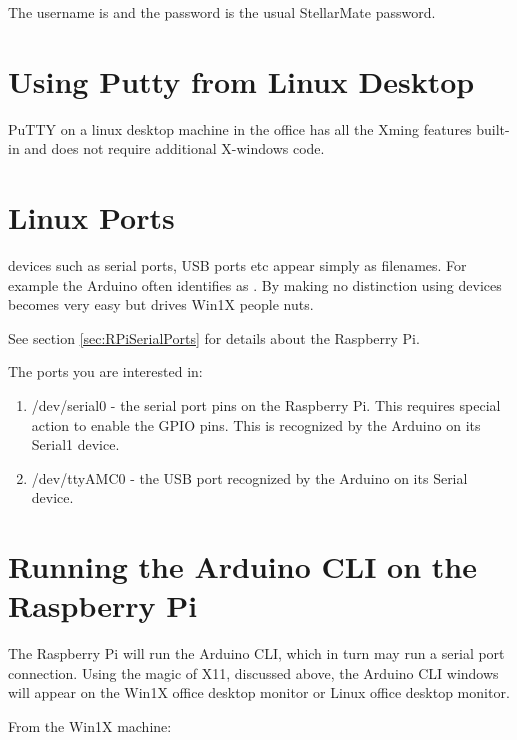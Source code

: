 The username is  and the password is the usual
StellarMate password.

\section{Using Putty from Linux Desktop} \label{sec:PuttyLinuxDesktop}

PuTTY on a linux desktop machine in the office has all the Xming features
built-in and does not require additional X-windows code.

\section{Linux Ports}

devices such as serial ports, USB ports etc appear simply as
filenames.  For example the Arduino often identifies as
. By making no distinction using devices becomes
very easy but drives Win1X people nuts.

See section \ref{sec:RPiSerialPorts} for details about the Raspberry Pi.

The ports you are interested in:

\vspace{-.15cm}
\begin{enumerate}\addtolength{\itemsep}{-0.5\baselineskip}
   \item   /dev/serial0 - the serial port pins on the Raspberry Pi. This requires 
special action to enable the GPIO pins. This is recognized by the Arduino on its Serial1
 device.
   \item   /dev/ttyAMC0 - the USB port recognized by the Arduino on its Serial
 device.
\end{enumerate}

\section{Running the Arduino CLI on the Raspberry Pi}

The Raspberry Pi will run the Arduino CLI, which in turn may run a
serial port connection. Using the magic of X11, discussed above, the
Arduino CLI windows will appear on the Win1X office desktop monitor or
Linux office desktop monitor.

From the Win1X machine:

